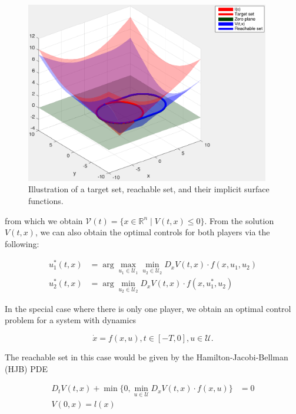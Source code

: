 \begin{figure}
	\centering
	\includegraphics[width=0.95\textwidth]{"fig/RSExample"}
	\caption{Illustration of a target set, reachable set, and their implicit surface functions.}
	\label{fig:RSExample}
\end{figure}

\noindent from which we obtain $\mathcal{V}(t) = \{x\in\mathbb{R}^n \mid V(t,x)\le 0\}$. From the solution $V(t,x)$, we can also obtain the optimal controls for both players via the following:

\begin{equation} \label{eq:HJI_ctrl_syn}
\begin{aligned}
u_1^*(t,x) &= \arg \max_{u_1\in\mathcal{U}_1} \min_{u_2\in\mathcal U_2} D_x V(t,x) \cdot f(x,u_1,u_2)\\
u_2^*(t,x) &= \arg \min_{u_2\in\mathcal{U}_2} D_x V(t,x) \cdot f(x,u_1^*,u_2)
\end{aligned}
\end{equation}

In the special case where there is only one player, we obtain an optimal control problem for a system with dynamics

\begin{equation} \label{eq:dyn_d}
\dot{x} = f(x, u), t\in [-T,0], u\in\mathcal U.
\end{equation}

The reachable set in this case would be given by the Hamilton-Jacobi-Bellman (HJB) PDE

\begin{equation} \label{eq:HJBPDE}
\begin{aligned}
D_t V(t,x) + \min \{0, \min_{u\in\mathcal{U}} D_x V(t,x) \cdot f(x,u)\} &= 0 \\
V(0,x) = l(x)&
\end{aligned}
\end{equation}

